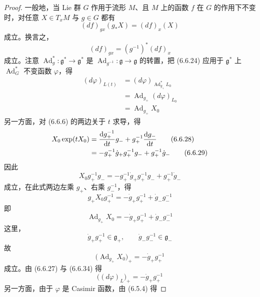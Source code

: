 \begin{proof}
一般地，当 Lie 群 $G$ 作用于流形 $M$、且 $M$ 上的函数 $f$ 在 $G$ 的作用下不变时，对任意 $X\in T_xM$ 与 $g\in G$ 都有
\begin{equation}
  (df)_{gx}(g_*X) = (df)_x(X)
  \tag{6.6.23}
\end{equation}
成立。换言之，
\begin{equation}
  (df)_{gx} = (g^{-1})^*(df)_x
  \tag{6.6.24}
\end{equation}
成立。注意 $\operatorname{Ad}^*_g:\mathfrak{g}^*\to\mathfrak{g}^*$ 是 $\operatorname{Ad}_{g^{-1}}:\mathfrak{g}\to\mathfrak{g}$ 的转置，把 (6.6.24) 应用于 $\mathfrak{g}^*$ 上 $\operatorname{Ad}^*_G$ 不变函数 $\varphi$，得
\begin{align}
  (d\varphi)_{L(t)} &= (d\varphi)_{\operatorname{Ad}^*_{g_+}L_0} \tag{6.6.25}\\
  &= \operatorname{Ad}_{g_+}(d\varphi)_{L_0} \tag{6.6.26}\\
  &= \operatorname{Ad}_{g_+}X_0 \tag{6.6.27}
\end{align}
另一方面，对 (6.6.6) 的两边关于 $t$ 求导，得
\begin{align}
  X_0\exp(tX_0) &= \frac{\mathrm{d} g_+^{-1}}{\mathrm{d} t}g_- + g_+^{-1}\frac{\mathrm{d} g_-}{\mathrm{d} t} \tag{6.6.28}\\
  &= -g_+^{-1}\dot{g}_+g_+^{-1}g_- + g_+^{-1}\dot{g}_- \tag{6.6.29}
\end{align}
因此
\begin{equation}
  X_0g_+^{-1}g_- = -g_+^{-1}\dot{g}_+g_+^{-1}g_- + g_+^{-1}\dot{g}_-
  \tag{6.6.30}
\end{equation}
成立，在此式两边左乘 $g_+$、右乘 $g_-^{-1}$，得
\begin{equation}
  g_+X_0g_+^{-1} = -\dot{g}_+g_+^{-1} + \dot{g}_-g_-^{-1}
  \tag{6.6.31}
\end{equation}
即
\begin{equation}
  \operatorname{Ad}_{g_+}X_0 = -\dot{g}_+g_+^{-1} + \dot{g}_-g_-^{-1}
  \tag{6.6.32}
\end{equation}
这里，
\begin{equation}
  \dot{g}_+g_+^{-1}\in\mathfrak{g}_+,\qquad \dot{g}_-g_-^{-1}\in\mathfrak{g}_-
  \tag{6.6.33}
\end{equation}
故
\begin{equation}
  \bigl(\operatorname{Ad}_{g_+}X_0\bigr)_+ = -\dot{g}_+g_+^{-1}
  \tag{6.6.34}
\end{equation}
成立。由 (6.6.27) 与 (6.6.34) 得
\begin{equation}
  \bigl((d\varphi)_L\bigr)_+ = -\dot{g}_+g_+^{-1}
  \tag{6.6.35}
\end{equation}
另一方面，由于 $\varphi$ 是 Casimir 函数，由 (6.5.4) 得


\end{proof}
